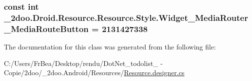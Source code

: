 \hypertarget{class__2doo_1_1_droid_1_1_resource_1_1_style_a84e23bc111c8b945d46ec608feb8067}{
\subsubsection[{Widget\_\-MediaRouter\_\-MediaRouteButton}]{\setlength{\rightskip}{0pt plus 5cm}const int \_\-2doo.Droid.Resource.Resource.Style.Widget\_\-MediaRouter\_\-MediaRouteButton = 2131427338}}
\label{class__2doo_1_1_droid_1_1_resource_1_1_style_a84e23bc111c8b945d46ec608feb8067}




The documentation for this class was generated from the following file:\begin{CompactItemize}
\item 
C:/Users/FrBea/Desktop/rendu/DotNet\_\-todolist\_ - Copie/2doo/\_\-2doo.Android/Resources/\hyperlink{_resource_8designer_8cs}{Resource.designer.cs}\end{CompactItemize}
